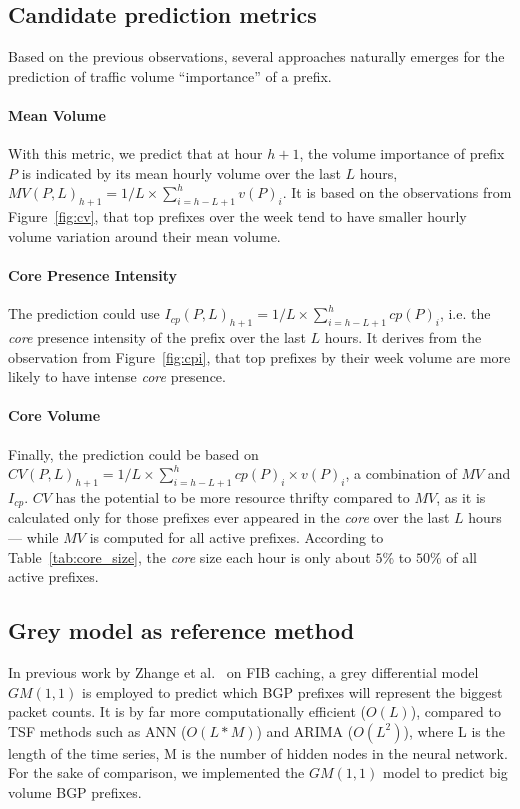 \subsection{Candidate prediction metrics}

Based on the previous observations, several approaches naturally emerges for the prediction of traffic volume ``importance'' of a prefix.
\paragraph*{Mean Volume}
With this metric, we predict that at hour $h+1$, the volume importance of prefix $P$ is indicated by its mean hourly volume over the last $L$ hours, $MV(P,L)_{h+1} = 1/L \times \sum_{i = h-L+1}^{h} v(P)_i$.
It is based on the observations from Figure~\ref{fig:cv}, that top prefixes over the week tend to have smaller hourly volume variation around their mean volume.

\paragraph*{Core Presence Intensity}
The prediction could use $I_{cp}(P,L)_{h+1} = 1/L \times \sum_{i = h-L+1}^{h} cp(P)_i$, i.e. the \textit{core} presence intensity of the prefix over the last $L$ hours. It derives from the observation from Figure~\ref{fig:cpi}, that top prefixes by their week volume are more likely to have intense \textit{core} presence.

\paragraph*{Core Volume}
Finally, the prediction could be based on $CV(P,L)_{h+1} = 1/L \times \sum_{i = h-L+1}^{h} cp(P)_i \times v(P)_i$,  a combination of $MV$ and $I_{cp}$.
$CV$ has the potential to be more resource thrifty compared to $MV$, as it is calculated only for those prefixes ever appeared in the \textit{core} over the last $L$ hours --- while $MV$ is computed for all active prefixes. According to Table~\ref{tab:core_size}, the \textit{core} size each hour is only about $5\%$ to $50\%$ of all active prefixes.

\subsection{Grey model as reference method}
In previous work by Zhange et al.\ \cite{Zhang2012} on FIB caching, a grey differential model $GM(1,1)$ \cite{Julong1989} is employed to predict which BGP prefixes will represent the biggest packet counts. 
It is by far more computationally efficient ($O(L)$), compared to \ac{TSF} methods such as \ac{ANN} ($O(L*M)$) and \ac{ARIMA} ($O(L^2)$), where L is the length of the time series, M is the number of hidden nodes in the neural network.
For the sake of comparison, we implemented the $GM(1,1)$ model to predict big volume BGP prefixes. 

